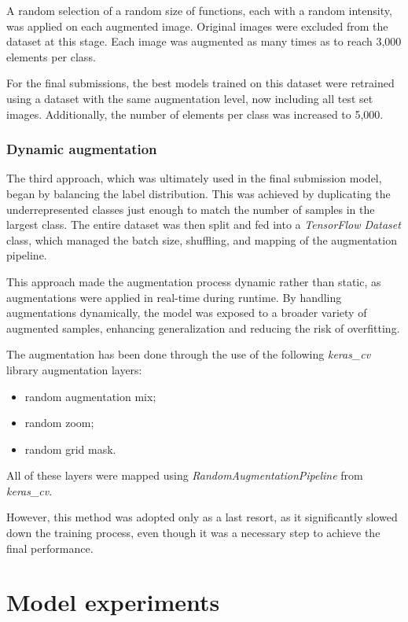 \documentclass[11pt]{article}
\begin{document}
A random selection of a random size of functions, each with a random intensity, was applied on each augmented image.
Original images were excluded from the dataset at this stage. 
Each image was augmented as many times as to reach 3,000 elements per class.

For the final submissions, the best models trained on this dataset were retrained using a dataset with the same augmentation level, now including all test set images. 
Additionally, the number of elements per class was increased to 5,000.

\subsubsection{Dynamic augmentation}

The third approach, which was ultimately used in the final submission model, began by balancing the label distribution.
This was achieved by duplicating the underrepresented classes just enough to match the number of samples in the largest class.
The entire dataset was then split and fed into a \textit{TensorFlow Dataset} class, which managed the batch size, shuffling, and mapping of the augmentation pipeline.

This approach made the augmentation process dynamic rather than static, as augmentations were applied in real-time during runtime. 
By handling augmentations dynamically, the model was exposed to a broader variety of augmented samples, enhancing generalization and reducing the risk of overfitting.

The augmentation has been done through the use of the following \textit{keras\_cv} library augmentation layers:

\begin{itemize}
    \item random augmentation mix;
    \item random zoom;
    \item random grid mask.
\end{itemize}

All of these layers were mapped using \textit{RandomAugmentationPipeline} from \textit{keras\_cv}.

However, this method was adopted only as a last resort, as it significantly slowed down the training process, even though it was a necessary step to achieve the final performance.

\section{Model experiments}
\end{document}
